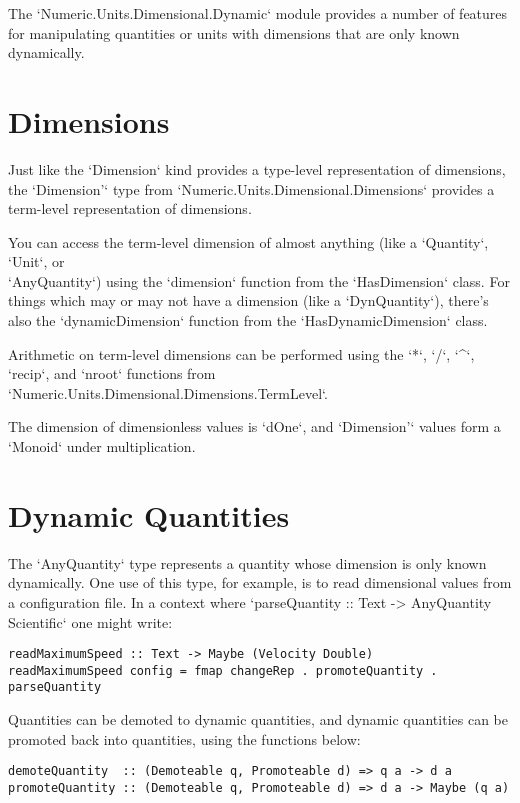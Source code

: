 \documentclass[11pt]{report}
\begin{document}
The `Numeric.Units.Dimensional.Dynamic` module provides a number of features for manipulating quantities or units with dimensions that are only
known dynamically.

\section{Dimensions}

Just like the `Dimension` kind provides a type-level representation of dimensions, the `Dimension'` type from `Numeric.Units.Dimensional.Dimensions`
provides a term-level representation of dimensions.

You can access the term-level dimension of almost anything (like a `Quantity`, `Unit`, or \\
`AnyQuantity`) using the `dimension` function from the `HasDimension` class. For things
which may or may not have a dimension (like a `DynQuantity`), there's also the `dynamicDimension`
function from the `HasDynamicDimension` class.

Arithmetic on term-level dimensions can be performed using the `*`, `/`, `^`, `recip`, and `nroot` functions from `Numeric.Units.Dimensional.Dimensions.TermLevel`.

The dimension of dimensionless values is `dOne`, and `Dimension'` values form a `Monoid` under multiplication.

\section{Dynamic Quantities}

The `AnyQuantity` type represents a quantity whose dimension is only known dynamically. One use of this
type, for example, is to read dimensional values from a configuration file. In a context where
`parseQuantity :: Text -> AnyQuantity Scientific` one might write:

\begin{lstlisting}
readMaximumSpeed :: Text -> Maybe (Velocity Double)
readMaximumSpeed config = fmap changeRep . promoteQuantity . parseQuantity
\end{lstlisting}

Quantities can be demoted to dynamic quantities, and dynamic quantities can be promoted back into quantities,
using the functions below:

\begin{lstlisting}
demoteQuantity  :: (Demoteable q, Promoteable d) => q a -> d a
promoteQuantity :: (Demoteable q, Promoteable d) => d a -> Maybe (q a)
\end{lstlisting}
\end{document}

